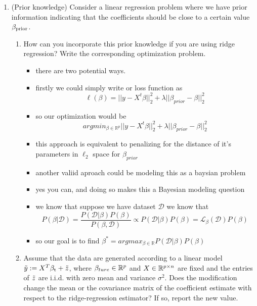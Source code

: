 \documentclass[12pt,twoside]{article}
\begin{document}
\begin{enumerate}
 \item (Prior knowledge) Consider a linear regression problem where we have prior information indicating that the coefficients should be close to a certain value $\beta_{\operatorname{prior}}$. 
 \begin{enumerate}
   \item How can you incorporate this prior knowledge if you are using ridge regression? Write the corresponding optimization problem. 
   \begin{itemize}
       \color{red}
       \item there are two potential ways. 
       \item firstly we could simply write or loss function as $$\ell(\beta)=||y-X^t\beta||_{2}^{2}+\lambda||\beta_{prior}-\beta||_{2}^2$$
       \item so our optimization would be $$argmin_{\beta\in\mathbb{R}^p}||y-X^t\beta||_{2}^{2}+\lambda||\beta_{prior}-\beta||_{2}^2$$
       \item this approach is equivalent to penalizing for the distance of it's parameters in $\ell_2$ space for $\beta_{prior}$
   \end{itemize}

   
   \begin{itemize}
   
       \color{blue}
       \item another valiid aproach could be modeling this as a baysian problem 
       \item yes you can, and doing so makes this a Bayesian modeling question
       \item we know that suppose we have dataset $\mathcal{D}$ we know that $$P(\beta|\mathcal{D})=\frac{P(\mathcal{D}|\beta)P(\beta)}{P(\beta, \mathcal{D})}\propto P(\mathcal{D}|\beta)P(\beta) = \mathcal{L}_{\beta}(\mathcal{D})P(\beta)$$
       \item so our goal is to find $\beta^{*}=argmax_{\beta\in \mathbb{R}}P(\mathcal{D}|\beta)P(\beta)$
   \end{itemize}
   \item Assume that the data are generated according to a linear model $\tilde{ y }:= X^T \beta_{\operatorname{t}} + \tilde{ z }$, where $\beta_{ture}\in \mathbb{R}^{p}$ and $X  \in \mathbb{R}^{p \times n}$ are fixed and the entries of $\tilde{ z }$ are i.i.d. with zero mean and variance $\sigma^2$. Does the modification change the mean or the covariance matrix of the coefficient estimate with respect to the ridge-regression estimator? If so, report the new value.
   \begin{itemize}


\end{itemize}
\end{enumerate}
\end{enumerate}
\end{document}
